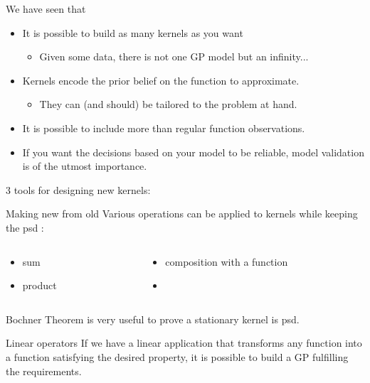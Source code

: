 \documentclass{beamer}
\begin{document}
\begin{frame}{}
 We have seen that \vspace{2mm}
\begin{block}{}
\begin{itemize}
 \item It is possible to build as many kernels as you want
 \begin{itemize}
 	\item Given some data, there is not one GP model but an infinity...
 \end{itemize}
 \item Kernels encode the prior belief on the function to approximate.
 \begin{itemize}
 	\item They can (and should) be tailored to the problem at hand.
 \end{itemize}
 \item It is possible to include more than regular function observations.
 \item If you want the decisions based on your model to be reliable, model validation is of the utmost importance.
\end{itemize}
\end{block}
\end{frame}

\begin{frame}{}
3 tools for designing new kernels: \vspace{2mm}
\begin{block}{Making new from old}
Various operations can be applied to kernels while keeping the psd :
\begin{columns}[c]
\begin{column}{3.5cm}
\begin{itemize}
 \item sum
 \item product
\end{itemize}
\end{column}
\begin{column}{7cm}
\begin{itemize}
 \item composition with a function
 \item[]
\end{itemize}
\end{column}
\end{columns}
\end{block}
\vspace{2mm}
\begin{block}{Bochner Theorem}
is very useful to prove a stationary kernel is psd.
\end{block}
\vspace{2mm}
\begin{block}{Linear operators}
If we have a linear application that transforms any function into a function satisfying the desired property, it is possible to build a GP fulfilling the requirements.
\end{block}
\end{frame}
\end{document}
